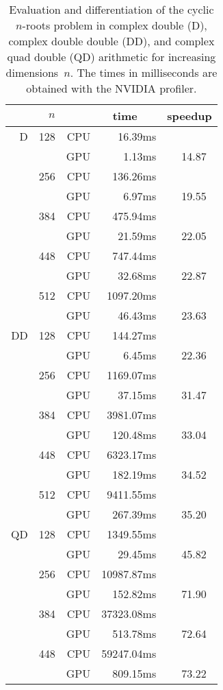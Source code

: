 \documentclass{article}
\begin{document}
\begin{table}[h]
\begin{center}
\caption{Evaluation and differentiation of the cyclic $n$-roots problem
in complex double (D), complex double double (DD), 
and complex quad double (QD) arithmetic for increasing dimensions~$n$.
The times in milliseconds are obtained with the NVIDIA profiler.}
\label{tabcyclicevaldiff}
\begin{tabular}{rrr|r|r}
   & $n$ &     &    time~~~ & speedup \\ \hline
D  & 128 & CPU &    16.39ms &        \\
   &     & GPU &     1.13ms & 14.87~ \\
   & 256 & CPU &   136.26ms &        \\
   &     & GPU &     6.97ms & 19.55~ \\ 
   & 384 & CPU &   475.94ms &        \\
   &     & GPU &    21.59ms & 22.05~ \\
   & 448 & CPU &   747.44ms &        \\
   &     & GPU &    32.68ms & 22.87~ \\
   & 512 & CPU &  1097.20ms &        \\
   &     & GPU &    46.43ms & 23.63~ \\ \hline
DD & 128 & CPU &   144.27ms &        \\
   &     & GPU &     6.45ms & 22.36~ \\
   & 256 & CPU &  1169.07ms &        \\
   &     & GPU &    37.15ms & 31.47~ \\
   & 384 & CPU &  3981.07ms &        \\
   &     & GPU &   120.48ms & 33.04~ \\
   & 448 & CPU &  6323.17ms &        \\
   &     & GPU &   182.19ms & 34.52~ \\
   & 512 & CPU &  9411.55ms &        \\
   &     & GPU &   267.39ms & 35.20~ \\ \hline
QD & 128 & CPU &  1349.55ms &        \\
   &     & GPU &    29.45ms & 45.82~ \\
   & 256 & CPU & 10987.87ms &        \\
   &     & GPU &   152.82ms & 71.90~ \\
   & 384 & CPU & 37323.08ms &        \\
   &     & GPU &   513.78ms & 72.64~ \\
   & 448 & CPU & 59247.04ms &        \\
   &     & GPU &   809.15ms & 73.22~ \\
\end{tabular}
\end{center}
\end{table}
\end{document}
